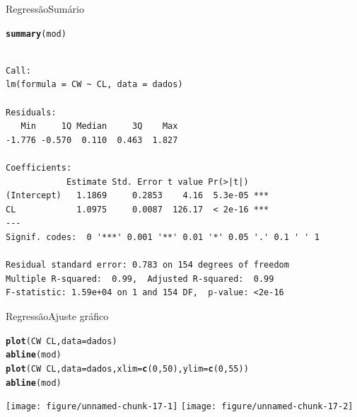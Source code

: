 \documentclass[10pt]{beamer}\usepackage[]{graphicx}\usepackage[]{color}
\makeatletter
\newcommand{\hlnum}[1]{\textcolor[rgb]{0.686,0.059,0.569}{#1}}%
\newcommand{\hlopt}[1]{\textcolor[rgb]{0,0,0}{#1}}%
\newcommand{\hlstd}[1]{\textcolor[rgb]{0.345,0.345,0.345}{#1}}%
\newcommand{\hlkwc}[1]{\textcolor[rgb]{0.333,0.667,0.333}{#1}}%
\newcommand{\hlkwd}[1]{\textcolor[rgb]{0.737,0.353,0.396}{\textbf{#1}}}%
\newenvironment{kframe}{%
 \def\at@end@of@kframe{}%
 \ifinner\ifhmode%
  \def\at@end@of@kframe{\end{minipage}}%
  \begin{minipage}{\columnwidth}%
 \fi\fi%
 \def\FrameCommand##1{\hskip\@totalleftmargin \hskip-\fboxsep
 \colorbox{shadecolor}{##1}\hskip-\fboxsep
     \hskip-\linewidth \hskip-\@totalleftmargin \hskip\columnwidth}%
 \MakeFramed {\advance\hsize-\width
   \@totalleftmargin\z@ \linewidth\hsize
   \@setminipage}}%
 {\par\unskip\endMakeFramed%
 \at@end@of@kframe}
\newenvironment{knitrout}{}{} %
\theoremstyle{definition}
\makeatother
\begin{document}
\begin{frame}[fragile=singleslide]{Regressão}{Sumário}
\begin{knitrout}\footnotesize
{}\color{fgcolor}\begin{kframe}
\begin{alltt}
\hlkwd{summary}\hlstd{(mod)}
\end{alltt}
\begin{verbatim}

Call:
lm(formula = CW ~ CL, data = dados)

Residuals:
   Min     1Q Median     3Q    Max 
-1.776 -0.570  0.110  0.463  1.827 

Coefficients:
            Estimate Std. Error t value Pr(>|t|)    
(Intercept)   1.1869     0.2853    4.16  5.3e-05 ***
CL            1.0975     0.0087  126.17  < 2e-16 ***
---
Signif. codes:  0 '***' 0.001 '**' 0.01 '*' 0.05 '.' 0.1 ' ' 1

Residual standard error: 0.783 on 154 degrees of freedom
Multiple R-squared:  0.99,	Adjusted R-squared:  0.99 
F-statistic: 1.59e+04 on 1 and 154 DF,  p-value: <2e-16
\end{verbatim}
\end{kframe}
\end{knitrout}
\end{frame}

\begin{frame}[fragile=singleslide]{Regressão}{Ajuste gráfico}
\begin{knitrout}\small
{}\color{fgcolor}\begin{kframe}
\begin{alltt}
\hlkwd{plot}\hlstd{(CW} \hlopt{~} \hlstd{CL,} \hlkwc{data} \hlstd{= dados)}
\hlkwd{abline}\hlstd{(mod)}
\hlkwd{plot}\hlstd{(CW} \hlopt{~} \hlstd{CL,} \hlkwc{data} \hlstd{= dados,} \hlkwc{xlim} \hlstd{=} \hlkwd{c}\hlstd{(}\hlnum{0}\hlstd{,}\hlnum{50}\hlstd{),} \hlkwc{ylim} \hlstd{=} \hlkwd{c}\hlstd{(}\hlnum{0}\hlstd{,}\hlnum{55}\hlstd{))}
\hlkwd{abline}\hlstd{(mod)}
\end{alltt}
\end{kframe}

{\centering \texttt{[image: figure/unnamed-chunk-17-1]} 
\texttt{[image: figure/unnamed-chunk-17-2]} 

}



\end{knitrout}
\end{frame}
\end{document}

